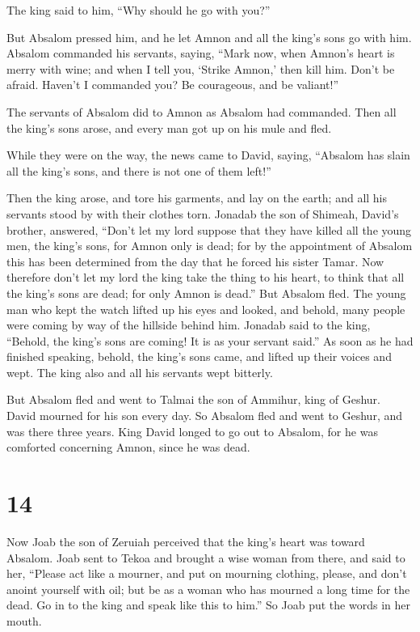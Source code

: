 The king said to him, ``Why should he go with you?''

 But Absalom pressed him, and he let Amnon and all the
king's sons go with him.  Absalom commanded his servants,
saying, ``Mark now, when Amnon's heart is merry with wine; and when I
tell you, `Strike Amnon,' then kill him. Don't be afraid. Haven't I
commanded you? Be courageous, and be valiant!''

 The servants of Absalom did to Amnon as Absalom had
commanded. Then all the king's sons arose, and every man got up on his
mule and fled.

 While they were on the way, the news came to David,
saying, ``Absalom has slain all the king's sons, and there is not one of
them left!''

 Then the king arose, and tore his garments, and lay on the
earth; and all his servants stood by with their clothes torn.
 Jonadab the son of Shimeah, David's brother, answered,
``Don't let my lord suppose that they have killed all the young men, the
king's sons, for Amnon only is dead; for by the appointment of Absalom
this has been determined from the day that he forced his sister Tamar.
 Now therefore don't let my lord the king take the thing to
his heart, to think that all the king's sons are dead; for only Amnon is
dead.''  But Absalom fled. The young man who kept the watch
lifted up his eyes and looked, and behold, many people were coming by
way of the hillside behind him.  Jonadab said to the king,
``Behold, the king's sons are coming! It is as your servant said.''
 As soon as he had finished speaking, behold, the king's
sons came, and lifted up their voices and wept. The king also and all
his servants wept bitterly.

 But Absalom fled and went to Talmai the son of Ammihur,
king of Geshur. David mourned for his son every day.  So
Absalom fled and went to Geshur, and was there three years.
 King David longed to go out to Absalom, for he was
comforted concerning Amnon, since he was dead.

\hypertarget{section-13}{%
\section{14}\label{section-13}}

 Now Joab the son of Zeruiah perceived that the king's heart
was toward Absalom.  Joab sent to Tekoa and brought a wise
woman from there, and said to her, ``Please act like a mourner, and put
on mourning clothing, please, and don't anoint yourself with oil; but be
as a woman who has mourned a long time for the dead.  Go in
to the king and speak like this to him.'' So Joab put the words in her
mouth.

